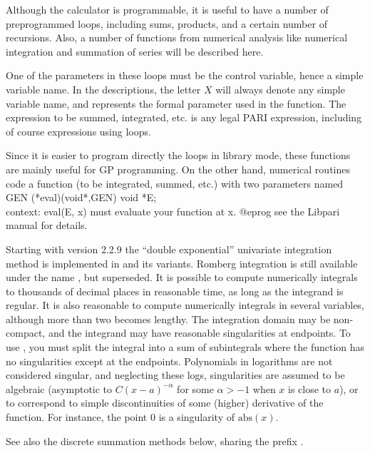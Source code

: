 Although the  calculator is programmable, it is useful to have
a number of preprogrammed loops, including sums, products, and a certain
number of recursions. Also, a number of functions from numerical analysis
like numerical integration and summation of series will be described here.

One of the parameters in these loops must be the control variable, hence a
simple variable name. In the descriptions, the letter $X$ will always denote
any simple variable name, and represents the formal parameter used in the
function. The expression to be summed, integrated, etc. is any legal PARI
expression, including of course expressions using loops.

Since it is easier to program directly the loops in library mode, these
functions are mainly useful for GP programming. On the other hand, numerical
routines code a function (to be integrated, summed, etc.) with two parameters
named
\bprog
  GEN (*eval)(void*,GEN)
  void *E;  \\ context: eval(E, x) must evaluate your function at x.
@eprog\noindent
see the Libpari manual for details.

Starting with version 2.2.9 the ``double exponential'' univariate
integration method is implemented in  and its variants. Romberg
integration is still available under the name , but
superseded. It is possible to compute numerically integrals to thousands of
decimal places in reasonable time, as long as the integrand is regular. It is
also reasonable to compute numerically integrals in several variables,
although more than two becomes lengthy. The integration domain may be
non-compact, and the integrand may have reasonable singularities at
endpoints. To use , you must split the integral into a sum
of subintegrals where the function has no singularities except at the
endpoints. Polynomials in logarithms are not considered singular, and
neglecting these logs, singularities are assumed to be algebraic (asymptotic
to $C(x-a)^{-\alpha}$ for some $\alpha > -1$ when $x$ is
close to $a$), or to correspond to simple discontinuities of some (higher)
derivative of the function. For instance, the point $0$ is a singularity of
$\text{abs}(x)$.

See also the discrete summation methods below, sharing the prefix .


